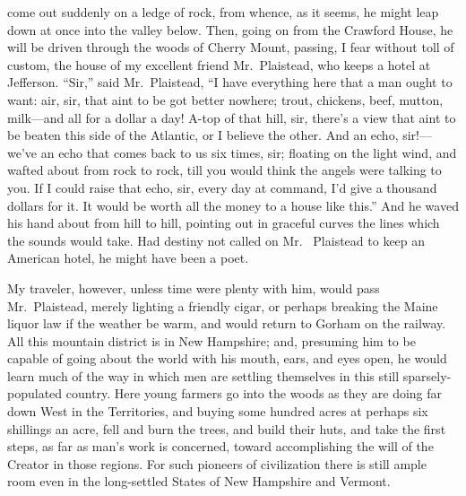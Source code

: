 come out suddenly on a ledge of rock, from whence, as it seems, he
might leap down at once into the valley below.  Then, going on from
the Crawford House, he will be driven through the woods of Cherry
Mount, passing, I fear without toll of custom, the house of my
excellent friend Mr.\ Plaistead, who keeps a hotel at Jefferson.
``Sir,'' said Mr.\ Plaistead, ``I have everything here that a man ought
to want: air, sir, that aint to be got better nowhere; trout,
chickens, beef, mutton, milk---and all for a dollar a day!  A-top of
that hill, sir, there's a view that aint to be beaten this side of
the Atlantic, or I believe the other.  And an echo, sir!---we've an
echo that comes back to us six times, sir; floating on the light
wind, and wafted about from rock to rock, till you would think the
angels were talking to you.  If I could raise that echo, sir, every
day at command, I'd give a thousand dollars for it.  It would be
worth all the money to a house like this.''  And he waved his hand
about from hill to hill, pointing out in graceful curves the lines
which the sounds would take.  Had destiny not called on Mr.\ %
Plaistead to keep an American hotel, he might have been a poet.

My traveler, however, unless time were plenty with him, would pass
Mr.\ Plaistead, merely lighting a friendly cigar, or perhaps
breaking the Maine liquor law if the weather be warm, and would
return to Gorham on the railway.  All this mountain district is in
New Hampshire; and, presuming him to be capable of going about the
world with his mouth, ears, and eyes open, he would learn much of
the way in which men are settling themselves in this still
sparsely-populated country.  Here young farmers go into the woods
as they are doing far down West in the Territories, and buying some
hundred acres at perhaps six shillings an acre, fell and burn the
trees, and build their huts, and take the first steps, as far as
man's work is concerned, toward accomplishing the will of the
Creator in those regions.  For such pioneers of civilization there
is still ample room even in the long-settled States of New
Hampshire and Vermont.

